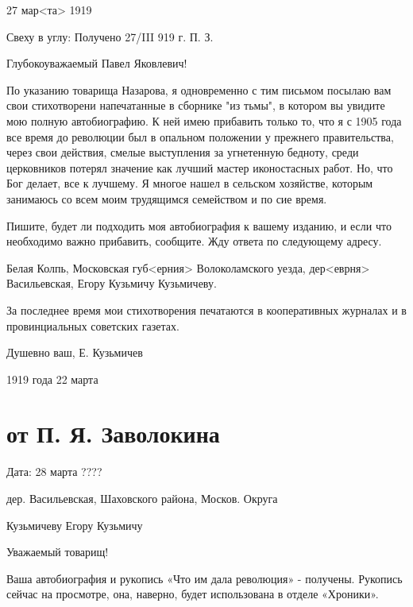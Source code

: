 \documentclass[]{memoir}
\begin{document}




                
27 мар<та> 1919

Свеху в углу: Получено 27/III 919 г. П. З.

Глубокоуважаемый Павел Яковлевич!

По указанию товарища Назарова, я одновременно с тим письмом посылаю вам свои стихотворени напечатанные в сборнике "из тьмы", в котором вы увидите мою полную автобиографию. К ней имею прибавить только то, что я с 1905 года все время до революции был в опальном положении у прежнего правительства, через свои действия, смелые выступления за угнетенную бедноту, среди церковников потерял значение как лучший мастер иконостасных работ. Но, что Бог делает, все к лучшему. Я многое нашел в сельском хозяйстве, которым занимаюсь со всем моим трудящимся семейством и по сие время.

Пишите, будет ли подходить моя автобиография к вашему изданию, и если что необходимо важно прибавить, сообщите. Жду ответа по следующему адресу.

Белая Колпь, Московская губ<ерния> Волоколамского уезда, дер<еврня> Васильевская, Егору Кузьмичу Кузьмичеву.

За последнее время мои стихотворения печатаются в кооперативных журналах и в провинциальных советских газетах.

Душевно ваш, Е. Кузьмичев

1919 года 22 марта

\section{от П. Я. Заволокина}
Дата: 28 марта ????

дер. Васильевская, Шаховского района, Москов. Округа

Кузьмичеву Егору Кузьмичу

Уважаемый товарищ!

Ваша автобиография и рукопись «Что им дала революция» - получены. Рукопись сейчас на просмотре, она, наверно, будет использована в отделе «Хроники».
\end{document}
